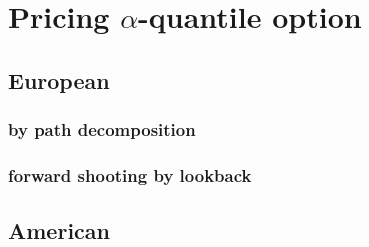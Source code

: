 \documentclass[11pt]{book}
\begin{document}
\chapter{Pricing $\alpha$-quantile option}
\section{European}
\subsection{by path decomposition}

\subsection{forward shooting by lookback}


\section{American}

{}

\end{document}
